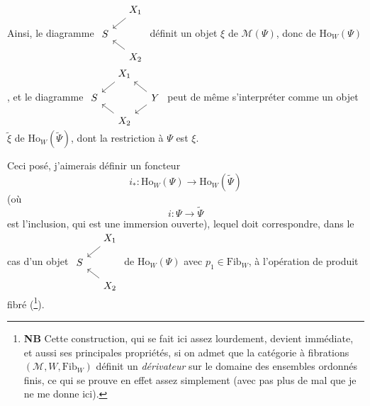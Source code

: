 \documentclass[11pt]{article}
\newcommand{\printedpage}[1]{\marginpar{\footnotesize p.~#1}}
\newcommand{\Ho}{\mathrm{Ho}}
\begin{document}
Ainsi, le diagramme $\vcenter{\hbox{\begin{tikzcd}[ampersand replacement=\&, row sep=small, column sep=small]
 \& X_1 \arrow[dl] \\
S \& \\
 \& X_2 \arrow[ul]
\end{tikzcd}}}$ définit un objet $\xi$ de $\mathcal{M}(\Psi)$, donc de $\Ho_W(\Psi)$, et le diagramme $\vcenter{\hbox{\begin{tikzcd}[ampersand replacement=\&, row sep=small, column sep=small]
 \& X_1 \arrow[dl] \& \\
S \& \& Y \arrow[ul] \arrow[dl] \\
 \& X_2 \arrow[ul] \&
\end{tikzcd}}}$ peut de même s'interpréter comme un objet $\tilde{\xi}$ de $\Ho_W(\tilde{\Psi})$, dont la restriction à $\Psi$ est $\xi$.

Ceci posé, j'aimerais définir un foncteur
\[
i_* : \Ho_W(\Psi) \longrightarrow \Ho_W(\tilde{\Psi})
\]
(où
\[
i : \Psi \longrightarrow \tilde{\Psi}
\]
est l'inclusion, qui est une immersion ouverte), lequel doit correspondre, dans le cas d'un objet $\vcenter{\hbox{\begin{tikzcd}[ampersand replacement=\&, row sep=small, column sep=small]
 \& X_1 \arrow[dl] \\
S \& \\
 \& X_2 \arrow[ul]
\end{tikzcd}}}$ de $\Ho_W(\Psi)$ avec $p_1 \in \mathrm{Fib}_W$, à l'opération de produit fibré (\footnote[131]{\textbf{NB} Cette construction, qui se fait ici assez lourdement, devient immédiate, et aussi ses principales propriétés, si on admet que la catégorie à fibrations $(\mathcal{M}, W, \mathrm{Fib}_W)$ définit un \textit{dérivateur} sur le domaine des ensembles ordonnés finis, ce qui se prouve en effet assez simplement (avec pas plus de mal que je ne me donne ici).}).

\printedpage{158}
\end{document}
